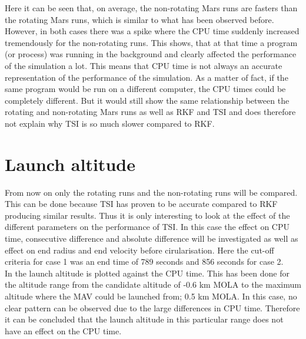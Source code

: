 Here it can be seen that, on average, the non-rotating Mars runs are fasters than the rotating Mars runs, which is similar to what has been observed before. However, in both cases there was a spike where the CPU time suddenly increased tremendously for the non-rotating runs. This shows, that at that time a program (or process) was running in the background and clearly affected the performance of the simulation a lot. This means that CPU time is not always an accurate representation of the performance of the simulation. As a matter of fact, if the same program would be run on a different computer, the CPU times could be completely different. But it would still show the same relationship between the rotating and non-rotating Mars runs as well as \ac{RKF} and \ac{TSI} and does therefore not explain why \ac{TSI} is so much slower compared to \ac{RKF}.




\section{Launch altitude}
\label{sec:launchAltitude}
From now on only the rotating runs and the non-rotating runs will be compared. This can be done because \ac{TSI} has proven to be accurate compared to \ac{RKF} producing similar results. Thus it is only interesting to look at the effect of the different parameters on the performance of \ac{TSI}. In this case the effect on CPU time, consecutive difference and absolute difference will be investigated as well as effect on end radius and end velocity before cirularisation. Here the cut-off criteria for case 1 was an end time of 789 seconds and 856 seconds for case 2.\\

\noindent
In  the launch altitude is plotted against the CPU time. This has been done for the altitude range from the candidate altitude of -0.6 km \ac{MOLA} to the maximum altitude where the \ac{MAV} could be launched from; 0.5 km \ac{MOLA}. In this case, no clear pattern can be observed due to the large differences in CPU time. Therefore it can be concluded that the launch altitude in this particular range does not have an effect on the CPU time.

